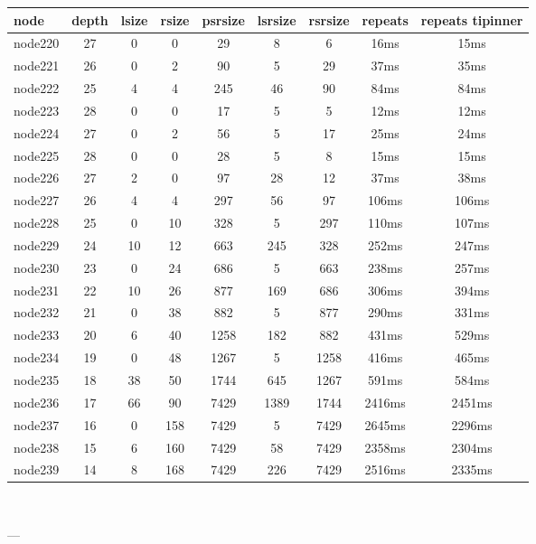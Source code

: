 \begin{tabular}{|l|c|c|c|c|c|c|c|c|}
\hline node & depth & lsize & rsize & psrsize & lsrsize & rsrsize   & repeats & repeats tipinner\\
    \hline node220 & 27 & 0 & 0 & 29 & 8 & 6 & 16ms & 15ms\\
    \hline node221 & 26 & 0 & 2 & 90 & 5 & 29 & 37ms & 35ms\\
    \hline node222 & 25 & 4 & 4 & 245 & 46 & 90 & 84ms & 84ms\\
    \hline node223 & 28 & 0 & 0 & 17 & 5 & 5 & 12ms & 12ms\\
    \hline node224 & 27 & 0 & 2 & 56 & 5 & 17 & 25ms & 24ms\\
    \hline node225 & 28 & 0 & 0 & 28 & 5 & 8 & 15ms & 15ms\\
    \hline node226 & 27 & 2 & 0 & 97 & 28 & 12 & 37ms & 38ms\\
    \hline node227 & 26 & 4 & 4 & 297 & 56 & 97 & 106ms & 106ms\\
    \hline node228 & 25 & 0 & 10 & 328 & 5 & 297 & 110ms & 107ms\\
    \hline node229 & 24 & 10 & 12 & 663 & 245 & 328 & 252ms & 247ms\\
    \hline node230 & 23 & 0 & 24 & 686 & 5 & 663 & 238ms & 257ms\\
    \hline node231 & 22 & 10 & 26 & 877 & 169 & 686 & 306ms & 394ms\\
    \hline node232 & 21 & 0 & 38 & 882 & 5 & 877 & 290ms & 331ms\\
    \hline node233 & 20 & 6 & 40 & 1258 & 182 & 882 & 431ms & 529ms\\
    \hline node234 & 19 & 0 & 48 & 1267 & 5 & 1258 & 416ms & 465ms\\
    \hline node235 & 18 & 38 & 50 & 1744 & 645 & 1267 & 591ms & 584ms\\
    \hline node236 & 17 & 66 & 90 & 7429 & 1389 & 1744 & 2416ms & 2451ms\\
    \hline node237 & 16 & 0 & 158 & 7429 & 5 & 7429 & 2645ms & 2296ms\\
    \hline node238 & 15 & 6 & 160 & 7429 & 58 & 7429 & 2358ms & 2304ms\\
    \hline node239 & 14 & 8 & 168 & 7429 & 226 & 7429 & 2516ms & 2335ms\\

\hline
\end{tabular} \

---


